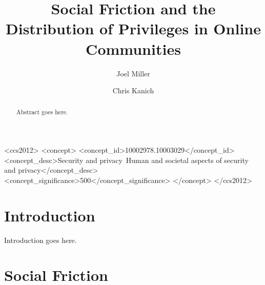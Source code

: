 \documentclass[sigconf,authordraft]{acmart}
\begin{document}
\title{Social Friction and the Distribution of Privileges in Online Communities}

%

\author{Joel Miller}

\author{Chris Kanich}







\begin{abstract}
Abstract goes here.
\end{abstract}


\begin{CCSXML}
<ccs2012>
   <concept>
       <concept_id>10002978.10003029</concept_id>
       <concept_desc>Security and privacy~Human and societal aspects of security and privacy</concept_desc>
       <concept_significance>500</concept_significance>
       </concept>
 </ccs2012>
\end{CCSXML}




\maketitle

\section{Introduction}

Introduction goes here.

\section{Social Friction}
\end{document}
